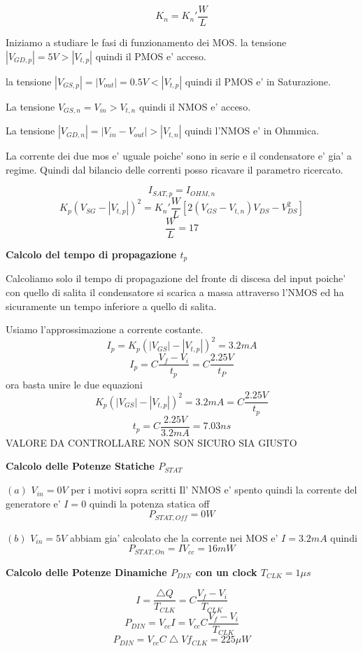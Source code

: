 \documentclass[\main/main.tex]{subfiles}
\begin{document}
\[ K_n = K_n' \frac{W}{L} \]

Iniziamo a studiare le fasi di funzionamento dei MOS.
la tensione $|V_{GD,p}| = 5V > |V_{t,p}|$ quindi il PMOS e' acceso.

la tensione $|V_{GS,p}| = |V_{out}| = 0.5V < |V_{t,p}|$ quindi il PMOS e' in Saturazione.

La tensione $V_{GS,n} = V_{in} > V_{t,n}$ quindi il NMOS e' acceso.

La tensione $|V_{GD,n}| = |V_{in} - V_{out}| > |V_{t,n}|$ quindi l'NMOS e' in Ohmmica.

La corrente dei due mos e' uguale poiche' sono in serie e il condensatore e' gia' a regime.
Quindi dal bilancio delle correnti posso ricavare il parametro ricercato.

\[I_{SAT,p} = I_{OHM,n}\]
\[K_p \left(V_{SG} - |V_{t,p}| \right)^2 = K_n' \frac{W}{L} \left[ 2 \left( V_{GS} - V_{t,n} \right) V_{DS} - V_{DS}^2 \right]\]
\[\frac{W}{L} = 17\]

\textbf{Calcolo del tempo di propagazione $t_p$}

Calcoliamo solo il tempo di propagazione del fronte di discesa del input poiche' con quello di salita il condensatore si scarica a massa attraverso l'NMOS ed ha sicuramente un tempo inferiore a quello di salita.

Usiamo l'approssimazione a corrente costante.
\[I_p = K_p \left(|V_{GS}| - |V_{t,p}| \right)^2 = 3.2mA\]
\[I_p = C \frac{V_f - V_i}{t_p} = C \frac{2.25V}{t_P}\]
ora basta unire le due equazioni
\[ K_p \left(|V_{GS}| - |V_{t,p}| \right)^2 = 3.2mA = C \frac{2.25V}{t_p}\]
\[t_p = C \frac{2.25V}{3.2mA} = 7.03ns\]
VALORE DA CONTROLLARE NON SON SICURO SIA GIUSTO

\clearpage
\textbf{Calcolo delle Potenze Statiche $P_{STAT}$}

$(a)$ $V_{in} = 0V$ per i motivi sopra scritti Il' NMOS e' spento quindi la corrente del generatore e' $I = 0$ quindi la potenza statica off
\[P_{STAT,Off} = 0W\]

$(b)$ $V_{in} = 5V$ abbiam gia' calcolato che la corrente nei MOS e' $I = 3.2mA$ quindi
\[ P_{STAT,On} = I V_{cc} = 16mW\]

\textbf{Calcolo delle Potenze Dinamiche $P_{DIN}$ con un clock $T_{CLK} = 1 \mu s$}

\[ I = \frac{\bigtriangleup Q}{T_{CLK}} = C \frac{V_f - V_i}{T_{CLK}}\]
\[ P_{DIN} = V_{cc} I = V_{cc} C \frac{V_f - V_i}{T_{CLK}}\]
\[ P_{DIN} = V_{cc} C \bigtriangleup V f_{CLK} = 225 \mu W\]

\clearpage
\end{document}
